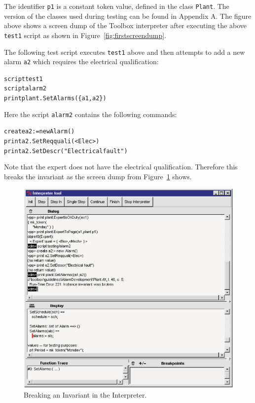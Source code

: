\documentclass[\pformat,12pt,twoside]{article}
\begin{document}
The identifier \texttt{p1} is a constant token value, defined in the class 
\texttt{Plant}. The version of the classes used during testing can be 
found in Appendix A. The figure above shows a screen dump of 
the Toolbox interpreter after executing the above \texttt{test1}
script as shown in Figure~\ref{fig:firstscreendump}.

The following test script executes \texttt{test1} above and then attempts 
to add a new alarm \texttt{a2} which requires the electrical qualification:

\small
\begin{alltt}
  script test1
  script alarm2
  print plant.SetAlarms(\{a1,a2\})
\end{alltt}
\normalsize

Here the script \texttt{alarm2} contains the following commands:

\small
\begin{alltt}
  create a2 := new Alarm()
  print a2.SetReqquali(\texttt{<}Elec\texttt{>})
  print a2.SetDescr("Electrical fault")
\end{alltt}
\normalsize

Note that the expert does not have the electrical qualification. 
Therefore this breaks the invariant as the screen dump 
from Figure~\ref{fig:secondscreendump} shows.

\begin{figure}[htpb]
\begin{center}
\includegraphics[width=5.546in]{secondscreendump}
\caption{Breaking an Invariant in the Interpreter.\label{fig:secondscreendump}}
\end{center}
\end{figure}
\end{document}
